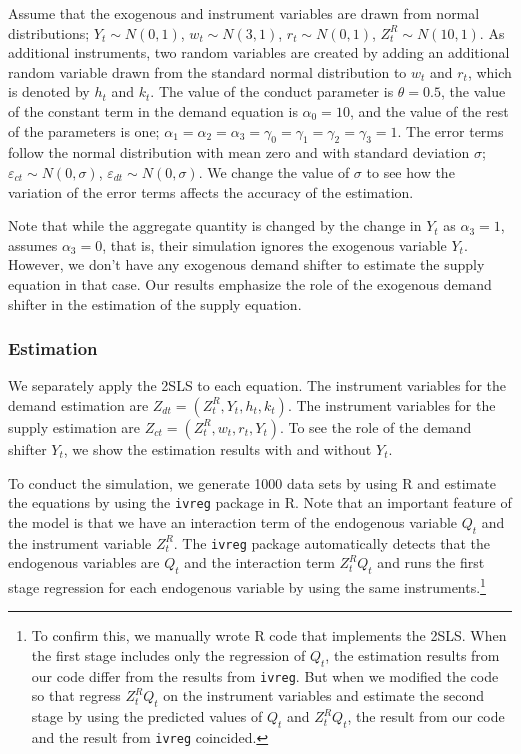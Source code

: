 \documentclass[11pt, a4paper]{article}
\begin{document}
Assume that the exogenous and instrument variables are drawn from normal distributions; $ Y_t \sim N(0,1)$, $w_t \sim N (3, 1)$, $r_t \sim N (0, 1)$, $ Z^R_t \sim N (10, 1)$.
As additional instruments, two random variables are created by adding an additional random variable drawn from the standard normal distribution to $w_t$ and $r_t$, which is denoted by $h_t$ and $k_t$.
The value of the conduct parameter is $\theta = 0.5$, the value of the constant term in the demand equation is $\alpha_0 = 10$, and the value of the rest of the parameters is one; $\alpha_1 = \alpha_2 = \alpha_3 = \gamma_0 = \gamma_1 = \gamma_2  = \gamma_3 = 1$. 
The error terms follow the normal distribution with mean zero and with standard deviation $\sigma$; $\varepsilon_{ct}\sim N(0,\sigma)$, $\varepsilon_{dt} \sim N(0,\sigma)$.
We change the value of $\sigma$ to see how the variation of the error terms affects the accuracy of the estimation.

Note that while the aggregate quantity is changed by the change in $Y_t$ as $\alpha_3 =1$, \cite{perloff2012collinearity} assumes $\alpha_3 = 0$, that is, their simulation ignores the exogenous variable $Y_t$.
However, we don't have any exogenous demand shifter to estimate the supply equation in that case.
Our results emphasize the role of the exogenous demand shifter in the estimation of the supply equation.



\subsubsection{Estimation}

We separately apply the 2SLS to each equation.
The instrument variables for the demand estimation are $Z_{dt} = (Z^R_t, Y_t, h_t, k_t)$.
The instrument variables for the supply estimation are $Z_{ct} = (Z^R_t, w_t, r_t, Y_t)$. 
To see the role of the demand shifter $Y_t$, we show the estimation results with and without $Y_t$.

To conduct the simulation, we generate 1000 data sets by using R and estimate the equations by using the \texttt{ivreg} package in R.
Note that an important feature of the model is that we have an interaction term of the endogenous variable $Q_t$ and the instrument variable $Z^R_t$.
The \texttt{ivreg} package automatically detects that the endogenous variables are $Q_t$ and the interaction term $Z^R_tQ_t$ and runs the first stage regression for each endogenous variable by using the same instruments.\footnote{To confirm this, we manually wrote R code that implements the 2SLS. When the first stage includes only the regression of $Q_t$, the estimation results from our code differ from the results from \texttt{ivreg}. But when we modified the code so that regress $Z^R_tQ_t$ on the instrument variables and estimate the second stage by using the predicted values of $Q_t$ and $Z^R_tQ_t$, the result from our code and the result from \texttt{ivreg} coincided.}
\end{document}
